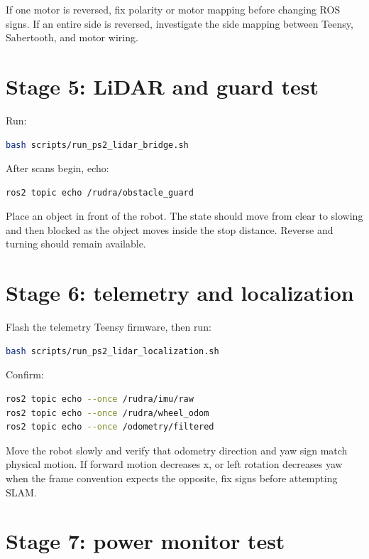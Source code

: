If one motor is reversed, fix polarity or motor mapping before changing ROS signs. If an entire side is reversed, investigate the side mapping between Teensy, Sabertooth, and motor wiring.

\section{Stage 5: LiDAR and guard test}

Run:

\begin{lstlisting}[language=bash]
bash scripts/run_ps2_lidar_bridge.sh
\end{lstlisting}

After scans begin, echo:

\begin{lstlisting}[language=bash]
ros2 topic echo /rudra/obstacle_guard
\end{lstlisting}

Place an object in front of the robot. The state should move from clear to slowing and then blocked as the object moves inside the stop distance. Reverse and turning should remain available.

\section{Stage 6: telemetry and localization}

Flash the telemetry Teensy firmware, then run:

\begin{lstlisting}[language=bash]
bash scripts/run_ps2_lidar_localization.sh
\end{lstlisting}

Confirm:

\begin{lstlisting}[language=bash]
ros2 topic echo --once /rudra/imu/raw
ros2 topic echo --once /rudra/wheel_odom
ros2 topic echo --once /odometry/filtered
\end{lstlisting}

Move the robot slowly and verify that odometry direction and yaw sign match physical motion. If forward motion decreases x, or left rotation decreases yaw when the frame convention expects the opposite, fix signs before attempting SLAM.

\section{Stage 7: power monitor test}


